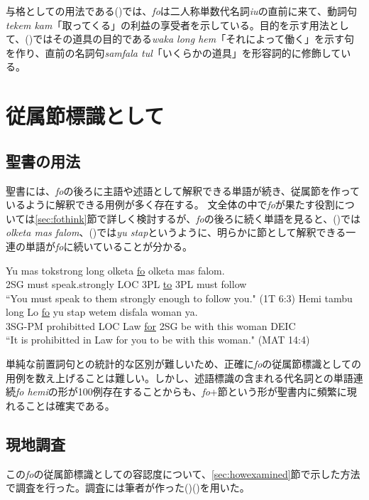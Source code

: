 与格としての用法である()では、\textit{fo}は二人称単数代名詞\textit{iu}の直前に来て、動詞句\textit{tekem kam}「取ってくる」の利益の享受者を示している。目的を示す用法として、()ではその道具の目的である\textit{waka long hem}「それによって働く」を示す句を作り、直前の名詞句\textit{samfala tul}「いくらかの道具」を形容詞的に修飾している。

\section{従属節標識として}
\subsection{聖書の用法}
聖書には、\textit{fo}の後ろに主語や述語として解釈できる単語が続き、従属節を作っているように解釈できる用例が多く存在する。
文全体の中で\textit{fo}が果たす役割については\ref{sec:fothink}節で詳しく検討するが、\textit{fo}の後ろに続く単語を見ると、()では\textit{olketa mas falom}、()では\textit{yu stap}というように、明らかに節として解釈できる一連の単語が\textit{fo}に続いていることが分かる。

\begin{exe}
\ex\label{ex:purposefo}
\gll Yu mas tokstrong long olketa \underline{fo} olketa mas falom.\\
2SG must speak.strongly LOC 3PL \underline{to} 3PL must follow\\
\glt ``You must speak to them strongly enough to follow you." (1T 6:3)
\ex\label{ex:tambufo}
\gll Hemi tambu long Lo \underline{fo} yu stap wetem disfala woman ya.\\
3SG-PM prohibitted LOC Law \underline{for} 2SG be with this woman DEIC\\
\glt ``It is prohibitted in Law for you to be with this woman." (MAT 14:4)
\end{exe}

単純な前置詞句との統計的な区別が難しいため、正確に\textit{fo}の従属節標識としての用例を数え上げることは難しい。しかし、述語標識の含まれる代名詞との単語連続\textit{fo hemi}の形が100例存在することからも、\textit{fo}+節という形が聖書内に頻繁に現れることは確実である。

\subsection{現地調査}\label{sec:fofield}
この\textit{fo}の従属節標識としての容認度について、\ref{sec:howexamined}節で示した方法で調査を行った。調査には筆者が作った()()を用いた。

